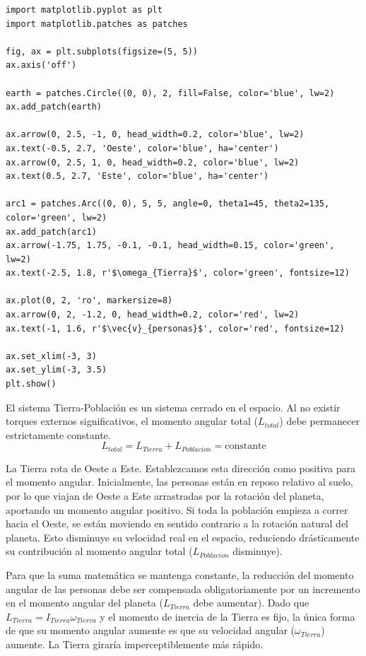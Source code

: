 \documentclass[12pt, a4paper]{article}
\begin{document}
\begin{verbatim}
import matplotlib.pyplot as plt
import matplotlib.patches as patches

fig, ax = plt.subplots(figsize=(5, 5))
ax.axis('off')

earth = patches.Circle((0, 0), 2, fill=False, color='blue', lw=2)
ax.add_patch(earth)

ax.arrow(0, 2.5, -1, 0, head_width=0.2, color='blue', lw=2)
ax.text(-0.5, 2.7, 'Oeste', color='blue', ha='center')
ax.arrow(0, 2.5, 1, 0, head_width=0.2, color='blue', lw=2)
ax.text(0.5, 2.7, 'Este', color='blue', ha='center')

arc1 = patches.Arc((0, 0), 5, 5, angle=0, theta1=45, theta2=135, color='green', lw=2)
ax.add_patch(arc1)
ax.arrow(-1.75, 1.75, -0.1, -0.1, head_width=0.15, color='green', lw=2)
ax.text(-2.5, 1.8, r'$\omega_{Tierra}$', color='green', fontsize=12)

ax.plot(0, 2, 'ro', markersize=8)
ax.arrow(0, 2, -1.2, 0, head_width=0.2, color='red', lw=2)
ax.text(-1, 1.6, r'$\vec{v}_{personas}$', color='red', fontsize=12)

ax.set_xlim(-3, 3)
ax.set_ylim(-3, 3.5)
plt.show()
\end{verbatim}

El sistema Tierra-Población es un sistema cerrado en el espacio. Al no existir torques externos significativos, el momento angular total ($L_{total}$) debe permanecer estrictamente constante.
$$L_{total} = L_{Tierra} + L_{Poblacion} = \text{constante}$$

La Tierra rota de Oeste a Este. Establezcamos esta dirección como positiva para el momento angular.
Inicialmente, las personas están en reposo relativo al suelo, por lo que viajan de Oeste a Este arrastradas por la rotación del planeta, aportando un momento angular positivo.
Si toda la población empieza a correr hacia el Oeste, se están moviendo en sentido contrario a la rotación natural del planeta. Esto disminuye su velocidad real en el espacio, reduciendo drásticamente su contribución al momento angular total ($L_{Poblacion}$ disminuye).

Para que la suma matemática se mantenga constante, la reducción del momento angular de las personas debe ser compensada obligatoriamente por un incremento en el momento angular del planeta ($L_{Tierra}$ debe aumentar).
Dado que $L_{Tierra} = I_{Tierra} \omega_{Tierra}$ y el momento de inercia de la Tierra es fijo, la única forma de que su momento angular aumente es que su velocidad angular ($\omega_{Tierra}$) aumente. La Tierra giraría imperceptiblemente más rápido.
\end{document}
